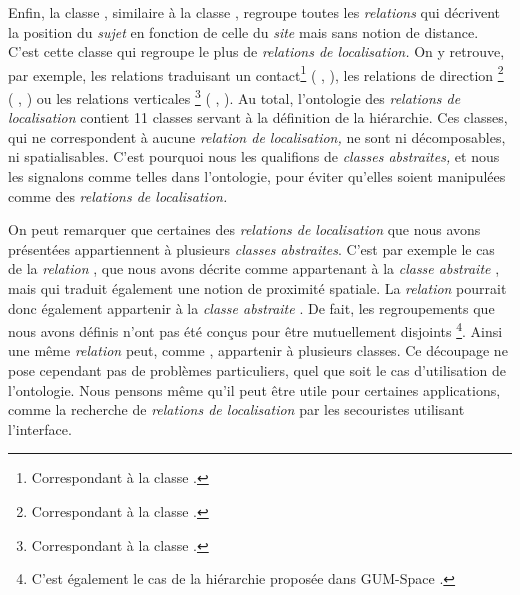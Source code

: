 Enfin, la classe
,
similaire à la classe
, regroupe
toutes les \emph{relations} qui décrivent la position du \emph{sujet}
en fonction de celle du \emph{site} mais sans notion de
distance. C'est cette classe qui regroupe le plus de \emph{relations
  de localisation.} On y retrouve, par exemple, les relations
traduisant un contact\footnote{Correspondant à la classe
  .} (\eg
{},
), les relations de direction
\footnote{Correspondant à la classe
  .} (\eg
{}, ) ou
les relations verticales \footnote{Correspondant à la classe
  .} (\eg
{}, ). Au
total, l'ontologie des \emph{relations de localisation} contient 11
classes servant à la définition de la hiérarchie. Ces classes, qui ne
correspondent à aucune \emph{relation de localisation,} ne sont ni
décomposables, ni spatialisables. C'est pourquoi nous les qualifions
de \emph{classes abstraites,} et nous les signalons comme telles dans
l'ontologie, pour éviter qu'elles soient manipulées comme des
\emph{relations de localisation.}

On peut remarquer que certaines des \emph{relations de localisation}
que nous avons présentées appartiennent à plusieurs \emph{classes
  abstraites}. C'est par exemple le cas de la \emph{relation}
, que nous avons décrite comme appartenant à la
\emph{classe abstraite}
, mais qui
traduit également une notion de proximité spatiale. La \emph{relation}
 pourrait donc également appartenir à la
\emph{classe abstraite}
. De fait,
les regroupements que nous avons définis n'ont pas été conçus pour
être mutuellement disjoints \footnote{C'est également le cas de la
  hiérarchie proposée dans GUM-Space \autocite{Bateman2010}.}. Ainsi
une même \emph{relation} peut, comme ,
appartenir à plusieurs classes. Ce découpage ne pose cependant pas de
problèmes particuliers, quel que soit le cas d'utilisation de
l'ontologie. Nous pensons même qu'il peut être utile pour certaines
applications, comme la recherche de \emph{relations de localisation}
par les secouristes utilisant l'interface.

